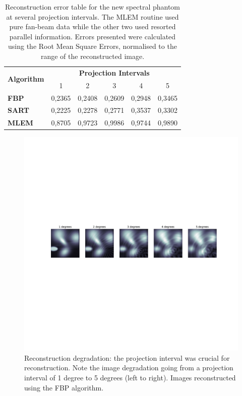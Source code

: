 \begin{table}[h]
    \centering
    \caption{Reconstruction error table for the new spectral phantom at
    several projection intervals. The MLEM routine used pure fan-beam data
        while the other two used resorted parallel information. Errors
        presented were calculated using the Root Mean Square Errors,
        normalised to the range of the reconstructed image. }
    \label{tab:rec_errors}
    \begin{tabular}{lccccc}
    \toprule
    \multirow{2}{*}{\textbf{Algorithm}} & \multicolumn{5}{c}{\textbf{Projection Intervals}} \\ \cline{2-6} 
                                        & 1        & 2        & 3
                                        & 4       & 5       \\ \midrule
    \textbf{FBP}                        & 0,2365   & 0,2408   & 0,2609
                                        & 0,2948  & 0,3465  \\\midrule
    \textbf{SART}                       & 0,2225   & 0,2278   & 0,2771
                                        & 0,3537  & 0,3302  \\\midrule
    \textbf{MLEM}                       & 0,8705   & 0,9723   & 0,9986
                                        & 0,9744  & 0,9890  \\
                                        \bottomrule
    \end{tabular}
\end{table}

\begin{figure}[htpb]
    \centering
    \includegraphics[clip, trim=4cm 15cm 3cm 14cm,
    width=\textwidth]{img/pdf/fbp_rec_degradation.pdf}
    \caption{Reconstruction degradation: the projection interval was
    crucial for reconstruction. Note the image degradation going from
    a projection interval of 1 degree to 5 degrees (left to right).
    Images reconstructed using the FBP algorithm.}
    \label{fig:rec_comparison}
\end{figure}
